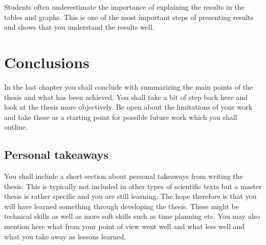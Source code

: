 Students often underestimate the importance of explaining the results in the tables and graphs. 
This is one of the most important steps of presenting results and shows that you understand the results well.

\chapter{Conclusions}\label{ch:Conclusions}

In the last chapter you shall conclude with summarizing the main points of the thesis and what has been achieved. 
You shall take a bit of step back here and look at the thesis more objectively.
Be open about the limitations of your work and take these as a starting point for possible future work which you shall outline.

\section{Personal takeaways}\label{sec:Personal}

You shall include a short section about personal takeaways from writing the thesis. 
This is typically not included in other types of scientific texts but a master thesis is rather specific and you are still learning. 
The hope therefore is that you will have learned something through developing the thesis. 
These might be technical skills as well as more soft skills such as time planning etc. 
You may also mention here what from your point of view went well and what less well and what you take away as lessons learned. 



